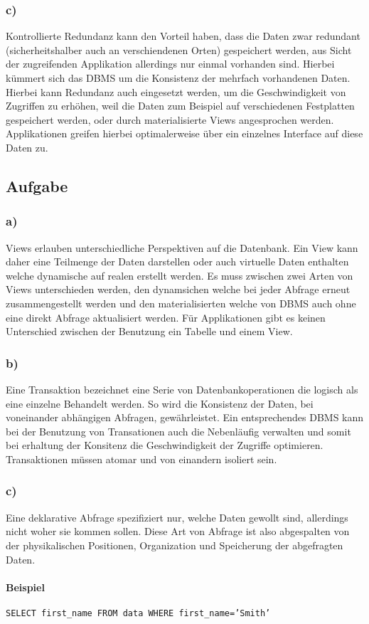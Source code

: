 \documentclass[12pt,a4paper,DIV=9]{scrartcl}
\newcounter{temp}
\newcommand{\aufgabe}[1]{
  \setcounter{temp}{\value{subsection}}
  \setcounter{subsection}{#1}
  \addtocounter{subsection}{-1}
  \subsection{Aufgabe}
  \setcounter{subsection}{\value{temp}}
}
\newcommand{\teil}[2][]{
  \subsubsection*{#2) #1}
}
\begin{document}
\teil{c}
  Kontrollierte Redundanz kann den Vorteil haben, dass die Daten zwar redundant (sicherheitshalber auch an verschiendenen Orten) gespeichert werden, aus Sicht der zugreifenden Applikation allerdings nur einmal vorhanden sind. Hierbei kümmert sich das DBMS um die Konsistenz der mehrfach vorhandenen Daten. 
  Hierbei kann Redundanz auch eingesetzt werden, um die Geschwindigkeit von Zugriffen zu erhöhen, weil die Daten zum Beispiel auf verschiedenen Festplatten gespeichert werden, oder durch materialisierte Views angesprochen werden.
  Applikationen greifen hierbei optimalerweise über ein einzelnes Interface auf diese Daten zu.

\aufgabe{4}
\teil{a}
  Views erlauben unterschiedliche Perspektiven auf die Datenbank. Ein View kann daher eine Teilmenge  der Daten darstellen oder auch virtuelle Daten enthalten welche dynamische auf realen erstellt werden. Es muss zwischen zwei Arten von Views unterschieden werden, den dynamsichen welche bei jeder Abfrage erneut zusammengestellt werden und den materialisierten welche von DBMS auch ohne eine direkt Abfrage aktualisiert werden. Für Applikationen gibt es keinen Unterschied zwischen der Benutzung ein Tabelle und einem View. 

\teil{b}
  Eine Transaktion bezeichnet eine Serie von Datenbankoperationen die logisch als eine einzelne Behandelt werden. So wird die Konsistenz der Daten, bei voneinander abhängigen Abfragen, gewährleistet. Ein entsprechendes DBMS kann bei der Benutzung von Transationen auch die Nebenläufig verwalten und somit bei erhaltung der Konsitenz die Geschwindigkeit der Zugriffe optimieren. Transaktionen müssen atomar und von einandern isoliert sein.

\teil{c}
  Eine deklarative Abfrage spezifiziert nur, welche Daten gewollt sind, allerdings nicht woher sie kommen sollen. Diese Art von Abfrage ist also abgespalten von der physikalischen Positionen, Organization und Speicherung der abgefragten Daten.

\paragraph{Beispiel} \texttt{SELECT first\_name FROM data WHERE first\_name='Smith'}
\end{document}
